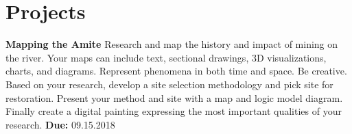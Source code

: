 \documentclass[11pt,article,oneside]{memoir}
\begin{document}
%
%

\section{Projects}

\noindent \textbf{Mapping the Amite}
Research and map the history and impact of mining on the river.
Your maps can include text, sectional drawings, 3D visualizations,
charts, and diagrams. 
Represent phenomena in both time and space. Be creative.
Based on your research, develop a site selection methodology
and pick site for restoration.
Present your method and site with a map and logic model diagram.
Finally create a digital painting expressing the most important
qualities of your research.
\textbf{Due:} 09.15.2018 \\
\end{document}
